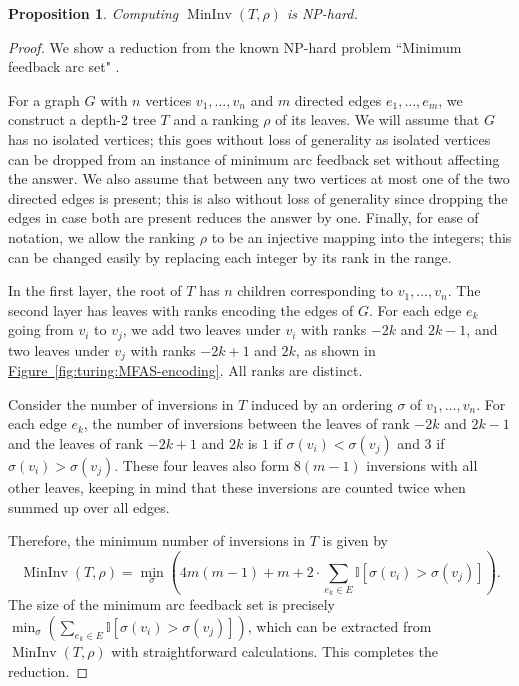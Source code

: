 \documentclass[11pt]{article}
\numberwithin{equation}{section}
\newtheorem{proposition}[theorem]{Proposition}
\theoremstyle{definition}
\theoremstyle{plain}
\newcommand{\expref}[2]{\hyperref[#2]{#1~\ref{#2}}}
\newcommand{\Indicator}{\mathbb{I}}
\newcommand{\ranking}{\rho}
\newcommand{\ordering}{\sigma}
\DeclareMathOperator{\MInv}{MinInv}
\begin{document}
\begin{proposition}
    Computing $\MInv(T,\ranking)$ is NP-hard.
\end{proposition}

\begin{proof}
%
%
%
%
%
%
%
    We show a reduction from the known NP-hard problem ``Minimum feedback arc set" \cite{Karp1972}.

    For a graph $G$ with $n$ vertices $v_1,\dots,v_n$ and $m$ directed edges $e_1,\dots,e_m$, we construct a depth-2 tree $T$ and a ranking $\ranking$ of its leaves. We will assume that $G$ has no isolated vertices; this goes without loss of generality as isolated vertices can be dropped from an instance of minimum arc feedback set without affecting the answer. We also assume that between any two vertices at most one of the two directed edges is present; this is also without loss of generality since dropping the edges in case both are present reduces the answer by one. Finally, for ease of notation, we allow the ranking $\ranking$ to be an injective mapping into the integers; this can be changed easily by replacing each integer by its rank in the range.
        
    In the first layer, the root of $T$ has $n$ children corresponding to $v_1,\dots,v_n$. The second layer has leaves with ranks encoding the edges of $G$. For each edge $e_k$ going from $v_i$ to $v_j$, we add two leaves under $v_i$ with ranks $-2k$ and $2k-1$, and two leaves under $v_j$ with ranks $-2k+1$ and $2k$, as shown in \expref{Figure}{fig:turing:MFAS-encoding}. All ranks are distinct.
    
    Consider the number of inversions in $T$ induced by an ordering $\ordering$ of $v_1,\dots,v_n$. For each edge $e_k$, the number of inversions between the leaves of rank $-2k$ and $2k-1$ and the leaves of rank $-2k+1$ and $2k$ is $1$ if $\sigma(v_i)<\sigma(v_j)$ and $3$ if $\sigma(v_i)>\sigma(v_j)$. These four leaves also form $8(m-1)$ inversions with all other leaves, keeping in mind that these inversions are counted twice when summed up over all edges.
    
    Therefore, the minimum number of inversions in $T$ is given by
    \begin{equation*}
        \MInv(T,\ranking)=\min_{\ordering} \left(4m(m-1)+m+ 2\cdot\sum_{e_k\in E}\Indicator[\sigma(v_i)>\sigma(v_j)]\right).
    \end{equation*}
    The size of the minimum arc feedback set is precisely $\min_{\ordering} \left( \sum_{e_k\in E}\Indicator[\sigma(v_i)>\sigma(v_j)] \right)$, which can be extracted from $\MInv(T,\ranking)$ with straightforward calculations. This completes the reduction.
\end{proof}
\end{document}
